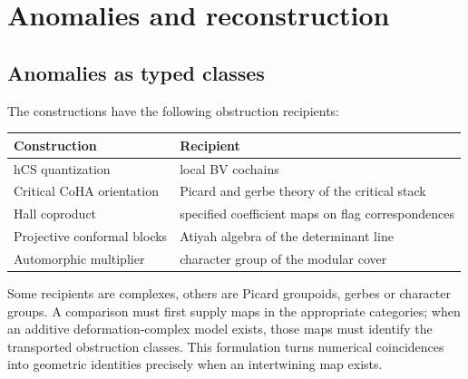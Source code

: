\chapter{Anomalies and reconstruction}

\section{Anomalies as typed classes}
The constructions have the following obstruction recipients:
\begin{center}
\small
\begin{tabularx}{0.96\textwidth}{@{}>{\raggedright\arraybackslash}p{}>{\raggedright\arraybackslash}X@{}}
\toprule
Construction&Recipient\\\midrule
hCS quantization&local BV cochains\\
Critical CoHA orientation&Picard and gerbe theory of the critical stack\\
Hall coproduct&specified coefficient maps on flag correspondences\\
Projective conformal blocks&Atiyah algebra of the determinant line\\
Automorphic multiplier&character group of the modular cover\\
\bottomrule
\end{tabularx}
\end{center}
Some recipients are complexes, others are Picard groupoids, gerbes or
character groups. A comparison must first supply maps in the appropriate
categories; when an additive deformation-complex model exists, those
maps must identify the transported obstruction classes. This formulation turns numerical coincidences into geometric identities precisely when an intertwining map exists.

